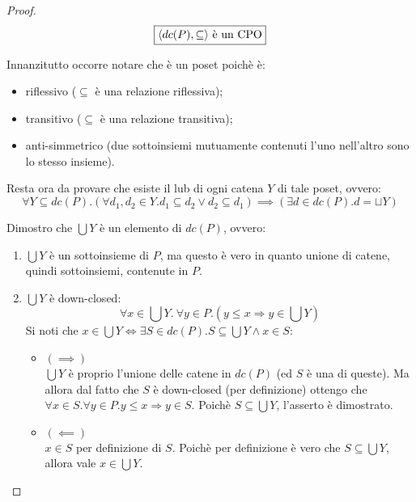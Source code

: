 \begin{proof}

$$
\boxed{\text{\ensuremath{\langle{}dc(P), \subseteq\rangle{}} è un CPO}}
$$

Innanzitutto occorre notare che  è un poset poichè è:

\begin{itemize}
  \item riflessivo ($\subseteq$ è una relazione riflessiva);
  \item transitivo ($\subseteq$ è una relazione transitiva);
  \item anti-simmetrico (due sottoinsiemi mutuamente contenuti l'uno nell'altro
    sono lo stesso insieme).
\end{itemize}

Resta ora da provare che esiste il lub di ogni catena $Y$ di tale poset, ovvero:
$$
\forall{Y}\subseteq dc(P).
          (\forall{d_1,d_2}\in Y.d_1 \subseteq d_2 \lor d_2 \subseteq d_1)
              \implies
          (\exists{d}\in dc(P). d = \sqcup Y)
$$

Dimostro che $\bigcup Y$ è un elemento di $dc(P)$, ovvero:
\begin{enumerate}
	\item $\bigcup Y$ è un sottoinsieme di $P$, ma questo è vero in quanto 
unione di catene, quindi sottoinsiemi, contenute in $P$.
	\item $\bigcup Y$ è down-closed:
	$$
	\forall x \in \bigcup Y.\ \forall y \in P.(y \leq x \Rightarrow y \in \bigcup Y)
	$$
	Si noti che
	$x \in \bigcup Y \iff \exists S \in dc(P).
		S \subseteq \bigcup Y \land x \in S$:
	\begin{itemize}
          \item $(\implies)$ \\
            $\bigcup Y$ è proprio l'unione delle catene in $dc(P)$ (ed $S$ è una
            di queste). Ma allora dal fatto che $S$ è down-closed 
            (per definizione) ottengo che 
            $\forall x \in S.\forall y \in P. y \leq x \Rightarrow y \in S$.
            Poichè $S \subseteq \bigcup Y$, l'asserto è dimostrato.
          \item $(\impliedby)$ \\
            $x \in S$ per definizione di $S$. Poichè per definizione è vero che
            $S \subseteq \bigcup Y$, allora vale $x \in \bigcup Y$.
        \end{itemize}
	\end{enumerate}



\end{proof}
